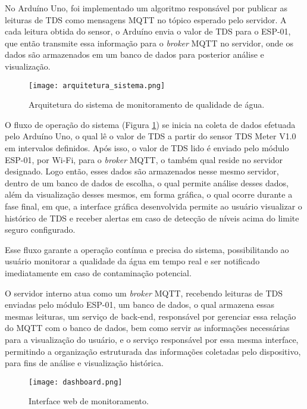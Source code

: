 \documentclass[12pt]{article}
\begin{document}
No Arduíno Uno, foi implementado um algoritmo responsável por publicar as leituras de TDS como mensagens MQTT no tópico esperado pelo servidor. A cada leitura obtida do sensor, o Arduíno envia o valor de TDS para o ESP-01, que então transmite essa informação para o \textit{broker} MQTT no servidor, onde os dados são armazenados em um banco de dados para posterior análise e visualização.

\begin{figure}[htbp!]
    \centering
    \texttt{[image: arquitetura\_sistema.png]}
    \caption{Arquitetura do sistema de monitoramento de qualidade de água.}
    \label{fig:arquitetura}
\end{figure}

O fluxo de operação do sistema (Figura \ref{fig:arquitetura}) se inicia na coleta de dados efetuada pelo Arduíno Uno, o qual lê o valor de TDS a partir do sensor TDS Meter V1.0 em intervalos definidos. Após isso, o valor de TDS lido é enviado pelo módulo ESP-01, por Wi-Fi, para o \textit{broker} MQTT, o também qual reside no servidor designado. Logo então, esses dados são armazenados nesse mesmo servidor, dentro de um banco de dados de escolha, o qual permite análise desses dados, além da visualização desses mesmos, em forma gráfica, o qual ocorre durante a fase final, em que, a interface gráfica desenvolvida permite ao usuário visualizar o histórico de TDS e receber alertas em caso de detecção de níveis acima do limite seguro configurado.

Esse fluxo garante a operação contínua e precisa do sistema, possibilitando ao usuário monitorar a qualidade da água em tempo real e ser notificado imediatamente em caso de contaminação potencial.

O servidor interno atua como um \textit{broker} MQTT, recebendo leituras de TDS enviadas pelo módulo ESP-01, um banco de dados, o qual armazena essas mesmas leituras, um serviço de back-end, responsável por gerenciar essa relação do MQTT com o banco de dados, bem como servir as informações necessárias para a visualização do usuário, e o serviço responsável por essa mesma interface, permitindo a organização estruturada das informações coletadas pelo dispositivo, para fins de análise e visualização histórica.

\begin{figure}[htbp!]
    \centering
    \texttt{[image: dashboard.png]}
    \caption{Interface web de monitoramento.}
    \label{fig:dashboard}
\end{figure}
\end{document}
